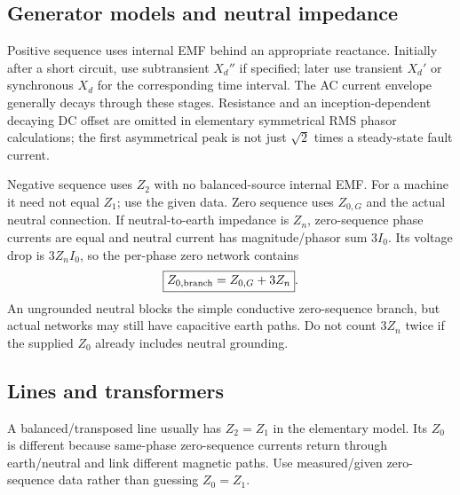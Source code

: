 \documentclass[11pt,a4paper]{article}
\newcommand{\ans}[1]{\boxed{#1}}
\begin{document}
\subsection{Generator models and neutral impedance}
Positive sequence uses internal EMF behind an appropriate reactance. Initially after a short circuit, use subtransient $X_d''$ if specified; later use transient $X_d'$ or synchronous $X_d$ for the corresponding time interval. The AC current envelope generally decays through these stages. Resistance and an inception-dependent decaying DC offset are omitted in elementary symmetrical RMS phasor calculations; the first asymmetrical peak is not just $\sqrt2$ times a steady-state fault current.

Negative sequence uses $Z_2$ with no balanced-source internal EMF. For a machine it need not equal $Z_1$; use the given data. Zero sequence uses $Z_{0,G}$ and the actual neutral connection. If neutral-to-earth impedance is $Z_n$, zero-sequence phase currents are equal and neutral current has magnitude/phasor sum $3I_0$. Its voltage drop is $3Z_nI_0$, so the per-phase zero network contains
\[
 \ans{Z_{0,\rm branch}=Z_{0,G}+3Z_n}.
\]
An ungrounded neutral blocks the simple conductive zero-sequence branch, but actual networks may still have capacitive earth paths. Do not count $3Z_n$ twice if the supplied $Z_0$ already includes neutral grounding.
\subsection{Lines and transformers}
A balanced/transposed line usually has $Z_2=Z_1$ in the elementary model. Its $Z_0$ is different because same-phase zero-sequence currents return through earth/neutral and link different magnetic paths. Use measured/given zero-sequence data rather than guessing $Z_0=Z_1$.
\end{document}
